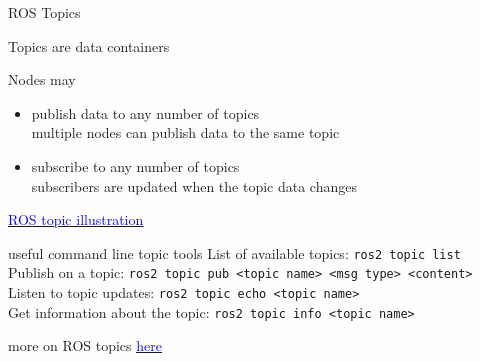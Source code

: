 \documentclass[compress]{beamer}
\newcommand{\link}[2]{\href{#1}{\underline{\textcolor{blue}{#2}}}}
\begin{document}
\begin{frame}{ROS Topics}

  \footnotesize

  Topics are data containers\\ \vspace{.2cm}
  
  Nodes may 
  \begin{itemize}
   \item publish data to any number of topics \\ {\tiny multiple nodes can publish data to the same topic}
   \item subscribe to any number of topics\\ {\tiny subscribers are updated when the topic data changes}
  \end{itemize}

  
  {\tiny \href{https://docs.ros.org/en/crystal/_images/Topic-MultiplePublisherandMultipleSubscriber.gif}{\underline{\textcolor{blue}{ROS topic illustration}}}}
  
  \vspace{.25cm}
  
  \begin{block}{{\tiny useful command line topic tools}}\tiny
    List of available topics: \texttt{ros2 topic list}\\
    Publish on a topic: \texttt{ros2 topic pub \textless topic name\textgreater\ \textless msg type\textgreater\  \textless content\textgreater }\\
    Listen to topic updates: \texttt{ros2 topic echo \textless topic name\textgreater\ }\\
    Get information about the topic: \texttt{ros2 topic info \textless topic name\textgreater\ }
   
  \end{block}

 
 \vfill
{\fontsize{4}{4.8}\selectfont more on ROS topics \link{https://docs.ros.org/en/foxy/Tutorials/Beginner-CLI-Tools/Understanding-ROS2-Topics/Understanding-ROS2-Topics.html}{here}}
 
\end{frame}
\end{document}
